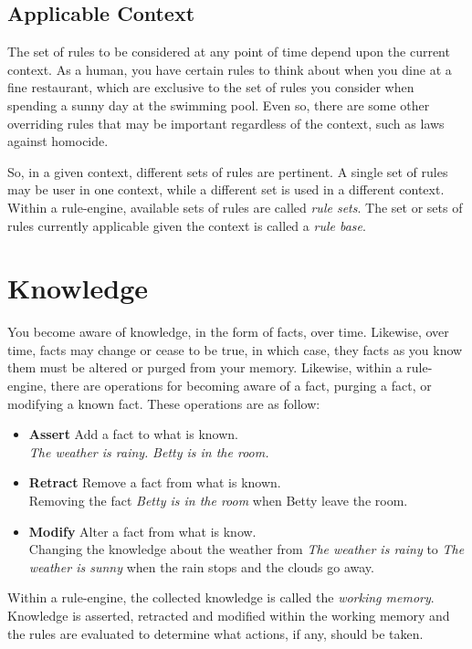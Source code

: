 \subsection{Applicable Context}

The set of rules to be considered at any point of time depend upon the
current context.  As a human, you have certain rules to think about
when you dine at a fine restaurant, which are exclusive to the set of
rules you consider when spending a sunny day at the swimming pool.
Even so, there are some other overriding rules that may be important
regardless of the context, such as laws against homocide.

So, in a given context, different sets of rules are pertinent.  A
single set of rules may be user in one context, while a different set
is used in a different context. Within a rule-engine, available sets 
of rules are called \emph{rule sets}.  The set or 
sets of rules currently applicable given the context is called a 
\emph{rule base}.

\section{Knowledge}

You become aware of knowledge, in the form of facts, over time.
Likewise, over time, facts may change or cease to be true, in 
which case, they facts as you know them must be altered or purged
from your memory.  Likewise, within a rule-engine, there are
operations for becoming aware of a fact, purging a fact, or
modifying a known fact.  These operations are as follow:

\begin{itemize}
  \item \textbf{Assert} Add a fact to what is known.\\
    \emph{The weather is rainy.} \emph{Betty is in the room.}
  \item \textbf{Retract} Remove a fact from what is known.\\
    Removing the fact \emph{Betty is in the room} when Betty leave the
    room.
  \item \textbf{Modify} Alter a fact from what is know.\\
    Changing the knowledge about the weather from \emph{The weather is
    rainy} to \emph{The weather is sunny} when the rain stops and the
    clouds go away.
\end{itemize}

Within a rule-engine, the collected knowledge is called the
\emph{working memory}.  Knowledge is
asserted, retracted and modified within the working memory and the
rules are evaluated to determine what actions, if any, should be
taken.

